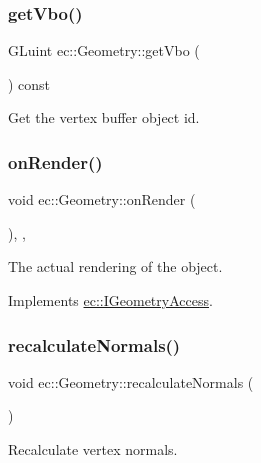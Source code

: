 \subsubsection{\texorpdfstring{get\+Vbo()}{getVbo()}}
{\footnotesize\ttfamily G\+Luint ec\+::\+Geometry\+::get\+Vbo (\begin{DoxyParamCaption}{ }\end{DoxyParamCaption}) const}

Get the vertex buffer object id. \mbox{\label{classec_1_1_geometry_a1f166e70fc880e88092f29ef46afb836}} 
\subsubsection{\texorpdfstring{on\+Render()}{onRender()}}
{\footnotesize\ttfamily void ec\+::\+Geometry\+::on\+Render (\begin{DoxyParamCaption}{ }\end{DoxyParamCaption})\hspace{0.3cm}{\ttfamily [override]}, {\ttfamily [protected]}, {\ttfamily [virtual]}}

The actual rendering of the object. 

Implements \mbox{\hyperlink{classec_1_1_i_geometry_access_a2ee418c9fa4eb266347bae2f0ef8095b}{ec\+::\+I\+Geometry\+Access}}.

\mbox{\label{classec_1_1_geometry_a228d4a0fa01a17379f24aee2c769b501}} 
\subsubsection{\texorpdfstring{recalculate\+Normals()}{recalculateNormals()}}
{\footnotesize\ttfamily void ec\+::\+Geometry\+::recalculate\+Normals (\begin{DoxyParamCaption}{ }\end{DoxyParamCaption})\hspace{0.3cm}{\ttfamily [virtual]}}

Recalculate vertex normals. \mbox{\label{classec_1_1_geometry_ad4f80cd4d4c22b108c33b9030e91467b}} 
